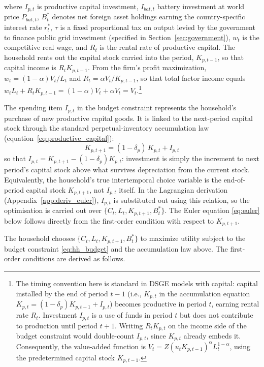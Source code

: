 \documentclass[12pt, a4paper]{article}
\begin{document}
	where $I_{p,t}$ is productive capital investment, $I_{bat,t}$ battery investment at world price $P_{bat,t}$, $B^*_t$ denotes net foreign asset holdings earning the country-specific interest rate $r^*_t$, $\tau$ is a fixed proportional tax on output levied by the government to finance public grid investment (specified in Section~\ref{sec:government}), $w_t$ is the competitive real wage, and $R_t$ is the rental rate of productive capital. The household rents out the capital stock carried into the period, $K_{p,t-1}$, so that capital income is $R_t K_{p,t-1}$. From the firm's profit maximization, $w_t = (1-\alpha)V_t/L_t$ and $R_t = \alpha V_t / K_{p,t-1}$, so that total factor income equals $w_t L_t + R_t K_{p,t-1} = (1-\alpha)V_t + \alpha V_t = V_t$.\footnote{\label{fn:timing_convention}The timing convention here is standard in DSGE models with capital: capital installed by the end of period $t-1$ (i.e., $K_{p,t}$ in the accumulation equation $K_{p,t} = (1-\delta_p)K_{p,t-1} + I_{p,t}$) becomes productive in period $t$, earning rental rate $R_t$. Investment $I_{p,t}$ is a use of funds in period $t$ but does not contribute to production until period $t+1$. Writing $R_t K_{p,t}$ on the income side of the budget constraint would double-count $I_{p,t}$, since $K_{p,t}$ already embeds it. Consequently, the value-added function is $V_t = Z(u_t K_{p,t-1})^\alpha L_t^{1-\alpha}$, using the predetermined capital stock $K_{p,t-1}$.}
	
	The spending item $I_{p,t}$ in the budget constraint represents the household's purchase of new productive capital goods. It is linked to the next-period capital stock through the standard perpetual-inventory accumulation law (equation~\eqref{eq:productive_capital}):
	\begin{equation*}
		K_{p,t+1} = (1-\delta_p)\,K_{p,t} + I_{p,t}
	\end{equation*}
	\noindent so that $I_{p,t} = K_{p,t+1} - (1-\delta_p)K_{p,t}$: investment is simply the increment to next period's capital stock above what survives depreciation from the current stock. Equivalently, the household's true intertemporal choice variable is the end-of-period capital stock $K_{p,t+1}$, not $I_{p,t}$ itself. In the Lagrangian derivation (Appendix~\ref{app:deriv_euler}), $I_{p,t}$ is substituted out using this relation, so the optimisation is carried out over $\{C_t, L_t, K_{p,t+1}, B^*_t\}$. The Euler equation \eqref{eq:euler} below follows directly from the first-order condition with respect to $K_{p,t+1}$.
	
	The household chooses $\{C_t, L_t, K_{p,t+1}, B^*_t\}$ to maximize utility subject to the budget constraint \eqref{eq:hh_budget} and the accumulation law above. The first-order conditions are derived as follows.
	
\end{document}
